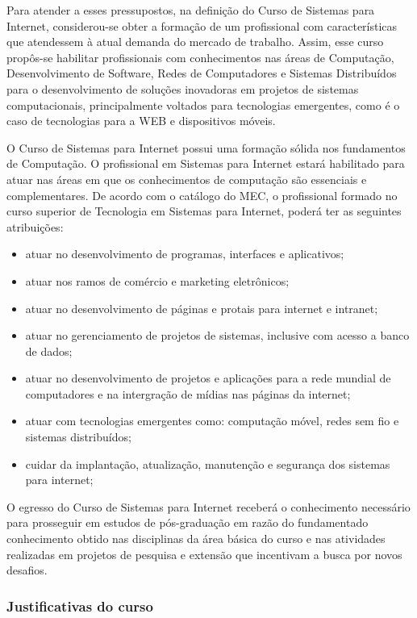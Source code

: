 Para atender a esses pressupostos, na definição do Curso de Sistemas para Internet, considerou-se obter a formação de um profissional com características que atendessem à atual demanda do mercado de trabalho. Assim, esse curso propôs-se habilitar profissionais com conhecimentos nas áreas de Computação, Desenvolvimento de Software, Redes de Computadores e Sistemas Distribu\'idos para o desenvolvimento de soluções inovadoras em projetos de sistemas computacionais, principalmente voltados para tecnologias emergentes, como \'e o caso de tecnologias para a WEB e dispositivos m\'oveis.

O Curso de Sistemas para Internet possui uma formação sólida nos fundamentos de Computação. O profissional em Sistemas para Internet estará habilitado para atuar nas áreas em que os conhecimentos de computação são essenciais e complementares.  De acordo com o cat\'alogo do MEC, o profissional formado no curso superior de Tecnologia em Sistemas para Internet, poder\'a ter as seguintes atribui\c{c}\~oes:

\begin{itemize}

\item atuar no desenvolvimento de programas, interfaces e aplicativos;
\item atuar nos ramos de com\'ercio e marketing eletr\^onicos;
\item atuar no desenvolvimento de p\'aginas e protais para internet e intranet;
\item atuar no gerenciamento de projetos de sistemas, inclusive com acesso a banco de dados;
\item atuar no desenvolvimento de projetos e aplica\c{c}\~oes para a rede mundial de computadores e na intergra\c{c}\~ao de m\'idias nas p\'aginas da internet;
\item atuar com tecnologias emergentes como: computa\c{c}\~ao m\'ovel, redes sem fio e sistemas distribu\'idos;
\item cuidar da implanta\c{c}\~ao, atualiza\c{c}\~ao, manuten\c{c}\~ao e seguran\c{c}a dos sistemas para internet;
\end{itemize}

O egresso do Curso de Sistemas para Internet receberá o conhecimento necessário para prosseguir em estudos de pós-graduação em razão do fundamentado conhecimento obtido nas disciplinas da área básica do curso e nas atividades realizadas em projetos de pesquisa e extensão que incentivam a busca por novos desafios.

\subsubsection{Justificativas do curso}

